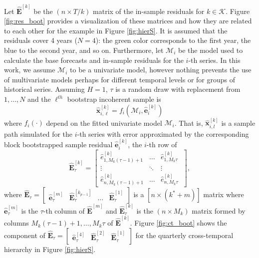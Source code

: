 \documentclass[a4paper,11pt]{article}
\newcommand{\evet}{\bm{e}}
\newcommand{\xvet}{\bm{x}}
\newcommand{\Evet}{\bm{E}}
\theoremstyle{definition}
\begin{document}
Let $\widehat{\Evet}^{[k]}$ be the $(n \times T/k)$ matrix of the in-sample residuals for $k \in \mathcal{K}$. Figure \ref{fig:res_boot} provides a visualization of these matrices and how they are related to each other for the example in Figure \ref{fig:hierS}. It is assumed that the residuals cover 4 years ($N=4$): the green color corresponds to the first year, the blue to the second year, and so on. Furthermore, let $\mathcal{M}_i$ be the model used to calculate the base forecasts and in-sample residuals for the $i$-th series. In this work, we assume $\mathcal{M}_i$ to be a univariate model, however nothing prevents the use of multivariate models perhaps for different temporal levels or for groups of historical series. Assuming $H = 1$, $\tau$ is a random draw with replacement from $1,\dots, N$ and the $\ell^{th}$ bootstrap incoherent sample is
$$
\widehat{\xvet}_{i,\ell}^{[k]} = f_i\left(\mathcal{M}_i, \widehat{\evet}_{i}^{[k]}\right)
$$
where $f_i(\cdot)$ depend on the fitted univariate model $\mathcal{M}_i$. That is, $\widehat{\xvet}_{i,l}^{[k]}$ is a sample path simulated for the $i$-th series with error approximated by the corresponding block bootstrapped sample residual $\widehat{\evet}_{i}^{[k]}$, the $i$-th row of
	$$
	\widehat{\Evet}^{[k]}_{\tau} = \begin{bmatrix}
		\widehat{e}^{[k]}_{1,M_k(\tau-1)+1} & \dots & \widehat{e}^{[k]}_{1,M_k\tau} \\
		\vdots & \ddots & \vdots \\
		\widehat{e}^{[k]}_{n,M_k(\tau-1)+1} & \dots & \widehat{e}^{[k]}_{n,M_k\tau} \
	\end{bmatrix},
	$$
	where $\widehat{\Evet}_{\tau} = \begin{bmatrix}
		\widehat{\evet}^{[m]}_\tau & \widehat{\Evet}^{[k_{p-1}]}_{\tau} & \dots &\widehat{\Evet}^{[1]}_{\tau}
	\end{bmatrix}$ is a $[n \times (k^\ast + m)]$ matrix where $\widehat{\evet}^{[m]}_\tau$ is the $\tau$-th column of $\widehat{\Evet}^{[m]}$ and $\widehat{\Evet}^{[k]}_{\tau}$ is the $(n \times M_k)$ matrix formed by columns $M_k(\tau-1)+1,\dots, M_k \tau$ of $\widehat{\Evet}^{[k]}$. 	Figure \ref{fig:ct_boot} shows the component of $\widehat{\Evet}_{\tau} = \begin{bmatrix}
		\widehat{\evet}^{[4]}_\tau & \widehat{\Evet}^{[2]}_{\tau}&\widehat{\Evet}^{[1]}_{\tau}
	\end{bmatrix}$ for the quarterly cross-temporal hierarchy in Figure \ref{fig:hierS}.
\end{document}
